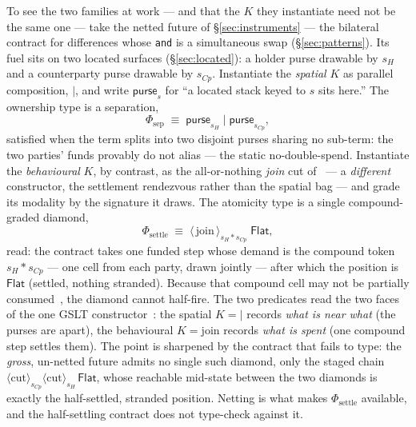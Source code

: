 \documentclass[11pt]{article}
\theoremstyle{definition}
\theoremstyle{plain}
\newcommand{\sig}[1]{\ensuremath{s_{#1}}}
\begin{document}
To see the two families at work --- and that the $K$ they instantiate need not be the same one ---
take the netted future of \S\ref{sec:instruments} --- the bilateral contract for differences whose
\texttt{and} is a simultaneous swap (\S\ref{sec:patterns}). Its fuel sits on two located surfaces
(\S\ref{sec:located}): a holder purse
drawable by $\sig{H}$ and a counterparty purse drawable by $\sig{Cp}$. Instantiate the \emph{spatial}
$K$ as parallel composition, $\mathbin{\mid}$, and write $\mathsf{purse}_s$ for ``a located stack
keyed to $s$ sits here.'' The ownership type is a separation,
\[
  \Phi_{\mathrm{sep}} \;\equiv\; \mathsf{purse}_{\sig{H}} \mathbin{\mid} \mathsf{purse}_{\sig{Cp}},
\]
satisfied when the term splits into two disjoint purses sharing no sub-term: the two parties' funds
provably do not alias --- the static no-double-spend. Instantiate the \emph{behavioural} $K$,
by contrast, as the all-or-nothing \emph{join} cut of~\cite[\S4.8]{CAR2026} --- a \emph{different}
constructor, the settlement rendezvous rather than the spatial bag --- and grade its modality by the
signature it draws. The atomicity type is a single compound-graded diamond,
\[
  \Phi_{\mathrm{settle}} \;\equiv\; \langle\,\mathrm{join}\,\rangle_{\sig{H}*\sig{Cp}}\;\mathsf{Flat},
\]
read: the contract takes one funded step whose demand is the compound token $\sig{H}*\sig{Cp}$ --- one
cell from each party, drawn jointly --- after which the position is $\mathsf{Flat}$ (settled, nothing
stranded). Because that compound cell may not be partially consumed~\cite[\S4.8.5]{CAR2026}, the
diamond cannot half-fire. The two predicates read the two faces of the one GSLT
constructor~\cite[\S4]{CGC2026}: the spatial $K=\mathord{\mid}$ records \emph{what is near what} (the
purses are apart), the behavioural $K=\mathrm{join}$ records \emph{what is spent} (one compound step
settles them). The point is sharpened by the contract that fails to type: the \emph{gross}, un-netted
future admits no single such diamond, only the staged chain
$\langle\mathrm{cut}\rangle_{\sig{Cp}}\langle\mathrm{cut}\rangle_{\sig{H}}\,\mathsf{Flat}$, whose
reachable mid-state between the two diamonds is exactly the half-settled, stranded position. Netting
is what makes $\Phi_{\mathrm{settle}}$ available, and the half-settling contract does not type-check
against it.
\end{document}
